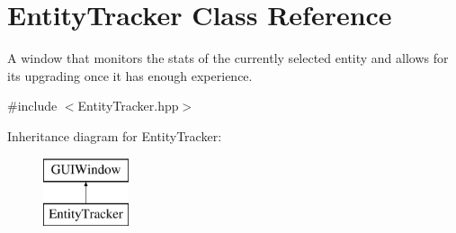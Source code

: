 \hypertarget{class_entity_tracker}{}\section{Entity\+Tracker Class Reference}
\label{class_entity_tracker}


A window that monitors the stats of the currently selected entity and allows for it\textquotesingle{}s upgrading once it has enough experience.  




{\ttfamily \#include $<$Entity\+Tracker.\+hpp$>$}

Inheritance diagram for Entity\+Tracker\+:\begin{figure}[H]
\begin{center}
\leavevmode
\includegraphics[height=2.000000cm]{class_entity_tracker}
\end{center}
\end{figure}
